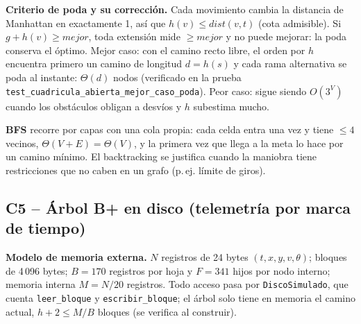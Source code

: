 \documentclass[11pt,letterpaper]{article}
\theoremstyle{plain}
\theoremstyle{definition}
\newcommand{\Th}{\Theta}
\begin{document}
\textbf{Criterio de poda y su corrección.} Cada movimiento cambia la distancia de Manhattan en
exactamente 1, así que $h(v)\le dist(v,t)$ (cota admisible). Si $g+h(v)\ge mejor$, toda extensión mide
$\ge mejor$ y no puede mejorar: la poda conserva el óptimo. Mejor caso: con el camino recto libre, el
orden por $h$ encuentra primero un camino de longitud $d=h(s)$ y cada rama alternativa se poda al
instante: $\Th(d)$ nodos (verificado en la prueba \texttt{test\_cuadricula\_abierta\_mejor\_caso\_poda}).
Peor caso: sigue siendo $O(3^V)$ cuando los obstáculos obligan a desvíos y $h$ subestima mucho.

\textbf{BFS} recorre por capas con una cola propia: cada celda entra una vez y tiene $\le4$ vecinos,
$\Th(V+E)=\Th(V)$, y la primera vez que llega a la meta lo hace por un camino mínimo. El backtracking se
justifica cuando la maniobra tiene restricciones que no caben en un grafo (p.\,ej. límite de giros).

\subsection{C5 -- Árbol B+ en disco (telemetría por marca de tiempo)}

\textbf{Modelo de memoria externa.} $N$ registros de 24 bytes $(t,x,y,v,\theta)$; bloques de 4\,096 bytes;
$B=170$ registros por hoja y $F=341$ hijos por nodo interno; memoria interna $M=N/20$ registros. Todo
acceso pasa por \texttt{DiscoSimulado}, que cuenta \texttt{leer\_bloque} y \texttt{escribir\_bloque}; el
árbol solo tiene en memoria el camino actual, $h+2\le M/B$ bloques (se verifica al construir).
\end{document}
